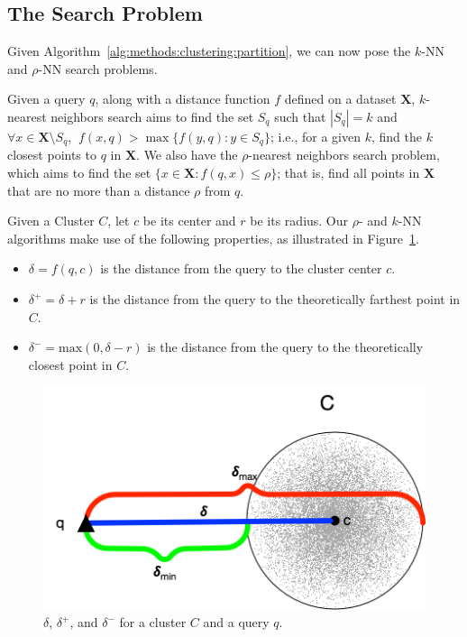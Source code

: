 \subsection{The Search Problem}
\label{subsec:methods:the-search-problem}

Given Algorithm~\ref{alg:methods:clustering:partition}, we can now pose the $k$-NN and $\rho$-NN search problems.

Given a query $q$, along with a distance function $f$ defined on a dataset $\textbf{X}$, $k$-nearest neighbors search aims to find the set $S_q$ such that $|S_q| = k$ and $\forall x \in \textbf{X} \setminus S_q$, $\ f(x, q) > \max\{f(y, q): y \in S_q \}$;
i.e., for a given $k$, find the $k$ closest points to $q$ in $\textbf{X}$.
We also have the $\rho$-nearest neighbors search problem, which aims to find the set $\{x \in \textbf{X}: f(q, x) \leq \rho \}$;
that is, find all points in $\textbf{X}$ that are no more than a distance $\rho$ from $q$.

Given a Cluster $C$, let $c$ be its center and $r$ be its radius. Our $\rho$- and $k$-NN algorithms make use of the following properties, as illustrated in Figure~\ref{fig:methods:deltas}.

\begin{itemize}
    \item $\delta = f(q, c)$ is the distance from the query to the cluster center $c$.
    \item $\delta^{+} = \delta + r$ is the distance from the query to the theoretically farthest point in $C$.
    \item $\delta^{-} = \text{max}(0, \delta - r)$ is the distance from the query to the theoretically closest point in $C$.
\end{itemize}

\begin{figure}[ht!]
    \centering
    \includegraphics[scale=0.5]{images/geometry/deltas.png}
    \caption{$\delta$, $\delta^{+}$, and $\delta^{-}$ for a cluster $C$ and a query $q$.}
    \label{fig:methods:deltas}
\end{figure}

